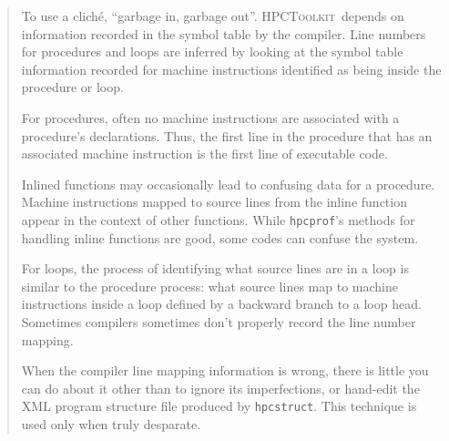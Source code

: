 \documentclass{article}
\newcommand{\HPCToolkit}{\textsc{HPCToolkit}}
\newcommand{\hpcstruct}{\texttt{hpcstruct}}
\newcommand{\hpcprof}{\texttt{hpcprof}}
\begin{document}
\begin{quote}

To use a clich\'{e}, ``garbage in, garbage out''. \HPCToolkit\ 
depends on information recorded in the symbol table by the
compiler. Line numbers for procedures and loops are inferred by
looking at the symbol table information recorded for machine
instructions identified as being inside the procedure or loop.

For procedures, often no machine instructions are associated with a
procedure's declarations. Thus, the first line in the procedure that
has an associated machine instruction is the first line of executable
code.

Inlined functions may occasionally lead to confusing data for a procedure. Machine
instructions mapped to source lines from the inline function appear in
the context of other functions. While \hpcprof 's methods for handling inline
functions are good, some codes can confuse the system.

For loops, the process of identifying what source lines are in a loop
is similar to the procedure process: what source lines map to machine instructions inside a
loop defined by a backward branch to a loop head. Sometimes compilers
sometimes don’t properly record the line number mapping.

\begin{comment}
  
Some common constructs such as Fortran's statement functions lead to
confusing output from \hpcstruct , \HPCToolkit 's binary analyzer. With
Compaq's C compiler on Alpha systems, machine instructions that result
from forward substitution of statement functions are mapped back to
the line numbers in which the statement functions are defined. \verb|bloop|'s
normalization phase ensures that source lines will appear only once in
hpcviewer’s display. Thus different loops in which the same statement
functions are instantiated will appear fused in the program structure
after \verb|bloop|'s normalization. There is no simple fix for this
problem. A related issue is that sampled performance data for a
machine instruction is mapped back to the source line that a machine
instruction was derived from.  When machine instructions found in
different loops map back to the source line for a statement function,
performance is not going to be attributed correctly. To cope with this
issue, the whole \HPCToolkit\ tool chain needs modifications to cope
with the fact that there are multiple instances of a source line that
need to be processed and viewed as distinct entities.

With SGI's \verb|MIPspro| compilers, we have seen loop headers attributed to
the last line before the loop containing executable code. In the case
of the Intel compiler, sometimes machine instructions found in
optimized code map to the end of the source file. Yuck!
\end{comment}

When the compiler line mapping information is wrong, there is little
you can do about it other than to ignore its imperfections, or
hand-edit the XML program structure file produced by \hpcstruct . This
technique is used only when truly desparate.
\end{quote}
\end{document}
